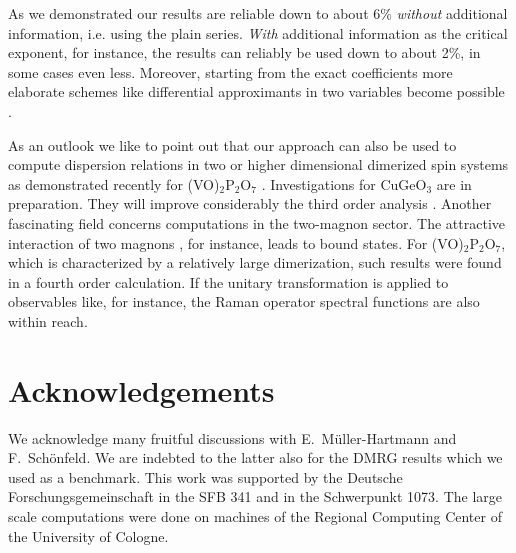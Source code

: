 As we demonstrated our results are reliable down to about 6\% 
{\em without} additional information, i.e. using the plain
series. {\em With} additional information as the critical
exponent, for instance, the results can reliably be used down to about
2\%, in some cases even less.
Moreover, starting from the exact coefficients
more elaborate schemes like differential approximants
in two variables become possible \cite{domb89}.

As an outlook we like to point out that our approach can also be used
to compute dispersion relations in two or higher dimensional dimerized
spin systems as demonstrated recently for (VO)$_2$P$_2$O$_7$ \cite{uhrig98c}.
Investigations for CuGeO$_3$ are in preparation. They will improve
 considerably the third order analysis \cite{uhrig97a}.
Another fascinating field concerns computations in the two-magnon sector.
The attractive interaction of two magnons \cite{uhrig96b},
 for instance, leads to bound states. For (VO)$_2$P$_2$O$_7$, 
which is characterized by a relatively large dimerization, such 
results were found in a fourth order calculation.
If the unitary transformation is applied to observables like,
for instance, the Raman operator spectral functions are also
within reach.


\section{Acknowledgements}
We acknowledge many fruitful discussions with E.~M\"uller-Hartmann and 
 F.~Sch\"onfeld. We are indebted to the latter also for the DMRG
results which we used as a benchmark. 
This work was supported by the Deutsche Forschungsgemeinschaft
in the SFB 341 and in the Schwer\-punkt 1073. The large scale computations 
were done on machines of the
 Regional Computing Center of the University of Cologne.

